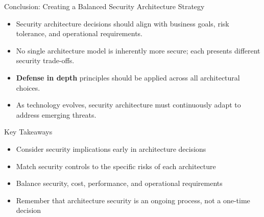 \documentclass{beamer}
\begin{document}
            \begin{frame}{Conclusion: Creating a Balanced Security Architecture Strategy}
            \begin{itemize}
            \item Security architecture decisions should align with business goals, risk tolerance, and operational requirements.
            \item No single architecture model is inherently more secure; each presents different security trade-offs.
            \item \textbf{Defense in depth} principles should be applied across all architectural choices.
            \item As technology evolves, security architecture must continuously adapt to address emerging threats.
            \end{itemize}
            
            \begin{block}{Key Takeaways}
            \begin{itemize}
            \item Consider security implications early in architecture decisions
            \item Match security controls to the specific risks of each architecture
            \item Balance security, cost, performance, and operational requirements
            \item Remember that architecture security is an ongoing process, not a one-time decision
            \end{itemize}
            \end{block}
            \end{frame}
\end{document}
